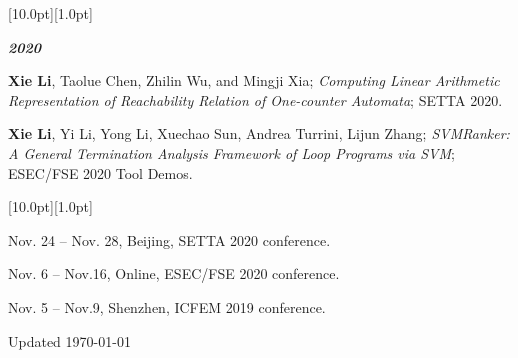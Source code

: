 \documentclass[12pt,a4paper,utf8]{report}
\begin{document}
\begin{minipage}[t]{16cm}
    \colorbox{subtitlecolor}{\raisebox{0pt}[10.0pt][1.0pt]{
        \textcolor{white}{\textsf{}}}}
\end{minipage}\par
\vspace{0.2cm}\hspace{0.5cm}
\begin{minipage}[t]{15cm}
    {\textbf{\em{2020}}}\par
    \quad \textbf{Xie Li}, Taolue Chen, Zhilin Wu, and Mingji Xia;{\em{ Computing Linear Arithmetic Representation of Reachability Relation of One-counter Automata}}; SETTA 2020.\par
    \vspace{0.2cm}
    \quad \textbf{Xie Li}, Yi Li, Yong Li, Xuechao Sun, Andrea Turrini, Lijun Zhang;{\em{ SVMRanker: A General Termination Analysis Framework of Loop Programs via SVM}}; ESEC/FSE 2020 Tool Demos.\par
\end{minipage}\par
\vspace{0.4cm}

\begin{minipage}[t]{16cm}
    \colorbox{subtitlecolor}{\raisebox{0pt}[10.0pt][1.0pt]{
        \textcolor{white}{\textsf{}}}}
\end{minipage}\par

\vspace{0.2cm}\hspace{0.5cm}
\begin{minipage}[t]{15cm}
	\quad Nov. 24 -- Nov. 28, Beijing, SETTA 2020 conference.\par
    \quad Nov. 6 -- Nov.16, Online, ESEC/FSE 2020 conference.\par
    \quad Nov. 5 -- Nov.9, Shenzhen, ICFEM 2019 conference.\par
    
\end{minipage}\par
\vspace{0.4cm}

\vspace{0.2cm}\hspace{0.5cm}

\begin{center}\vspace{1.0cm}
    Updated \monthyeardate\today
\end{center}
\end{document}
